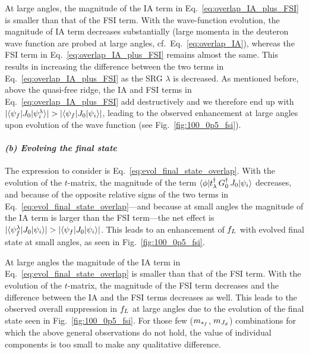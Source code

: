 	At large angles, the magnitude of the IA term in
	Eq.~\eqref{eq:overlap_IA_plus_FSI} is smaller than that of the FSI term.
	With the wave-function evolution, the magnitude of IA term decreases
	substantially (large momenta in the deuteron wave function are probed at
	large	angles, cf.~Eq.~\eqref{eq:overlap_IA}), whereas the FSI term in
	Eq.~\eqref{eq:overlap_IA_plus_FSI} remains almost the same.  This results in
	increasing the difference between the two terms in
	Eq.~\eqref{eq:overlap_IA_plus_FSI} as the SRG $\lambda$ is decreased.  As
	mentioned before, above the quasi-free ridge, the IA and FSI terms
	in Eq.~\eqref{eq:overlap_IA_plus_FSI} add destructively and we therefore end
	up with $|\langle \psi_f|J_0|\psi_i^\lambda\rangle| >
	|\langle \psi_f|J_0|\psi_i\rangle|$, leading to the observed enhancement at large
	angles upon evolution of the wave function (see Fig.~\ref{fig:100_0p5_fsi}).

	\paragraph{\emph{(b) Evolving the final state}}

	The expression to consider is Eq.~\eqref{eq:evol_final_state_overlap}.  With
	the evolution of the $t$-matrix, the magnitude of the term
	$\langle \phi|t^\dag_\lambda \, G_0^\dag \, J_0|\psi_i\rangle$
	decreases, and because of the opposite relative signs of the two terms in
	Eq.~\eqref{eq:evol_final_state_overlap}---and
	because at small angles the magnitude of the IA term is larger than the
	FSI term---the net
	effect is $|\langle \psi_f^\lambda|J_0|\psi_i\rangle| >
	|\langle \psi_f|J_0|\psi_i\rangle|$.  This leads to an enhancement of $f_L$ with
	evolved final state at small angles, as seen in Fig.~\ref{fig:100_0p5_fsi}.

	At large angles the magnitude of the IA term in
	Eq.~\eqref{eq:evol_final_state_overlap} is smaller than that of the FSI term.
	With the evolution of the $t$-matrix, the magnitude of the FSI term decreases
	and the difference between the IA and the FSI terms decreases as well.  This
	leads to the observed overall suppression in $f_L$ at large angles due to the
	evolution of the final state seen in Fig.~\ref{fig:100_0p5_fsi}.  For those
	few	($m_{s_f}$, $m_{J_d}$) combinations for which the above general observations do
	not	hold, the value of individual components is too small to make any
	qualitative	difference.

